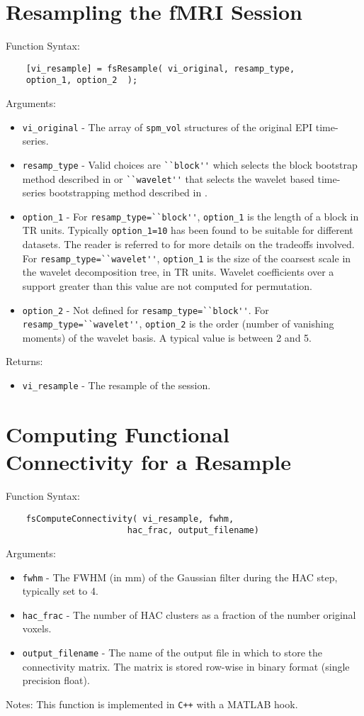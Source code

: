 \section{Resampling the fMRI Session}
Function Syntax:
\begin{verbatim}
    [vi_resample] = fsResample( vi_original, resamp_type,
    option_1, option_2  );
\end{verbatim}
Arguments:
\begin{itemize}
  \item \verb"vi_original" - The array of \verb"spm_vol" structures of the original EPI time-series.
  \item \verb"resamp_type" - Valid choices are \verb"``block''" which selects the block bootstrap method
  described in \cite{Janoos2011} or   \verb"``wavelet''" that selects the wavelet based
  time-series bootstrapping method described in \cite{Patel2006}.
  \item \verb"option_1" - For \verb"resamp_type=``block''",
  \verb"option_1" is the length of a block in TR units. Typically
  \verb"option_1=10" has been found to be suitable for different
  datasets. The reader is referred to \cite{Janoos2010g} for more
  details on the tradeoffs involved. For
  \verb"resamp_type=``wavelet''", \verb"option_1" is the size of
  the coarsest scale in the wavelet decomposition tree, in TR units.
  Wavelet coefficients over a support greater than this value are
  not computed for permutation.
  \item \verb"option_2" - Not defined for
  \verb"resamp_type=``block''".
  For \verb"resamp_type=``wavelet''", \verb"option_2" is the order
  (number of vanishing moments) of the wavelet basis. A typical value is
  between 2 and 5.
\end{itemize}
Returns:
\begin{itemize}
  \item \verb"vi_resample" - The resample of the session.
\end{itemize}


\section{Computing Functional Connectivity for a Resample}
Function Syntax:
\begin{verbatim}
    fsComputeConnectivity( vi_resample, fwhm,
                        hac_frac, output_filename)
\end{verbatim}
Arguments:
\begin{itemize}
  \item \verb"fwhm" - The FWHM (in mm) of the Gaussian filter during the
  HAC step, typically set to 4.
  \item \verb"hac_frac" - The number of HAC clusters as a
  fraction of the number original voxels.
  \item \verb"output_filename" - The name of the output file
  in which to store the connectivity matrix. The matrix is
  stored row-wise in binary format (single precision float).
\end{itemize}
 Notes: This function is implemented in \verb"C++" with a
MATLAB hook.

